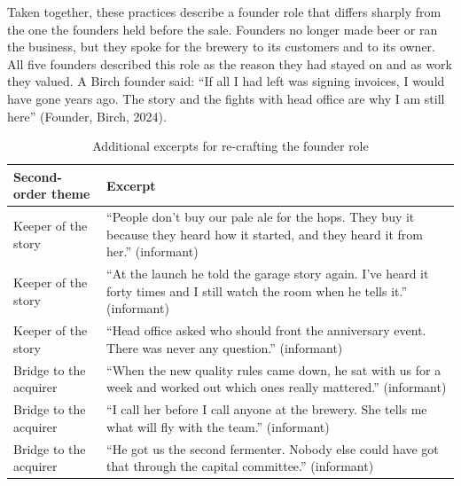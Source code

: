 \documentclass[12pt]{article}
\begin{document}
Taken together, these practices describe a founder role that differs sharply from the one the founders held before the sale. Founders no longer made beer or ran the business, but they spoke for the brewery to its customers and to its owner. All five founders described this role as the reason they had stayed on and as work they valued. A Birch founder said: ``If all I had left was signing invoices, I would have gone years ago. The story and the fights with head office are why I am still here'' (Founder, Birch, 2024).

\begin{table}[htbp]
\centering
\small
\renewcommand{\arraystretch}{1.3}
\caption{Additional excerpts for re-crafting the founder role}
\label{tab:recraft}
\begin{tabular}{@{}>{\raggedright\arraybackslash}p{4.2cm}>{\raggedright\arraybackslash}p{11.6cm}@{}}
\toprule
Second-order theme & Excerpt\\
\midrule
Keeper of the story & ``People don't buy our pale ale for the hops. They buy it because they heard how it started, and they heard it from her.'' (informant)\\
Keeper of the story & ``At the launch he told the garage story again. I've heard it forty times and I still watch the room when he tells it.'' (informant)\\
Keeper of the story & ``Head office asked who should front the anniversary event. There was never any question.'' (informant)\\
Bridge to the acquirer & ``When the new quality rules came down, he sat with us for a week and worked out which ones really mattered.'' (informant)\\
Bridge to the acquirer & ``I call her before I call anyone at the brewery. She tells me what will fly with the team.'' (informant)\\
Bridge to the acquirer & ``He got us the second fermenter. Nobody else could have got that through the capital committee.'' (informant)\\
\bottomrule
\end{tabular}
\end{table}
\end{document}

